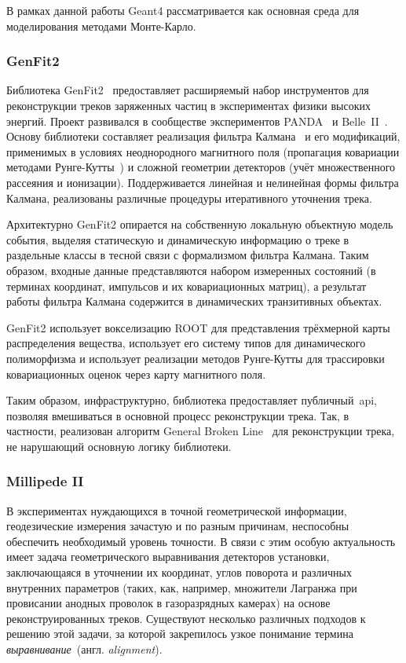 В рамках данной работы Geant4 рассматривается как основная среда для
моделирования методами Монте-Карло.

\subsubsection{GenFit2}

Библиотека GenFit2~\cite{Genfit2_Rauch_2015} предоставляет расширяемый
набор инструментов для реконструкции треков заряженных частиц
в экспериментах физики высоких энергий. Проект развивался
в сообществе экспериментов PANDA~\cite{panda-collaboration} и
Belle~II~\cite{belle-ii}. Основу библиотеки составляет реализация
фильтра Калмана~\cite{kalman-1960} и его модификаций,
применимых в условиях неоднородного
магнитного поля (пропагация ковариации методами Рунге-Кутты~\cite{StrandlieJacobians}) и
сложной геометрии детекторов (учёт множественного рассеяния и ионизации).
Поддерживается линейная и нелинейная формы фильтра
Калмана, реализованы различные процедуры итеративного уточнения
трека.

Архитектурно GenFit2 опирается на собственную локальную объектную модель
события,
выделяя статическую и динамическую информацию о треке в раздельные классы
в тесной связи с формализмом фильтра Калмана. Таким образом, входные
данные представляются набором измеренных состояний (в терминах координат,
импульсов и их ковариационных матриц), а результат работы фильтра Калмана
содержится в динамических транзитивных объектах.

GenFit2 использует вокселизацию ROOT для представления трёхмерной карты
распределения вещества,
использует его систему типов для динамического полиморфизма и использует
реализации методов Рунге-Кутты для трассировки ковариационных оценок
через карту магнитного поля.

Таким образом, инфраструктурно, библиотека предоставляет
публичный~\acrshort{api}, позволяя вмешиваться в основной процесс
реконструкции трека. Так, в частности, реализован алгоритм
General Broken Line~\cite{gbp-kleinwort} для реконструкции трека,
не нарушающий основную логику библиотеки.

\subsubsection{Millipede II}

В экспериментах нуждающихся в точной геометрической информации,
геодезические измерения зачастую и по разным причинам, неспособны обеспечить
необходимый уровень точности. В связи с этим особую актуальность имеет
задача геометрического выравнивания детекторов установки,
заключающаяся в уточнении их координат, углов поворота и различных
внутренних параметров (таких, как, например, множители Лагранжа
при провисании анодных проволок в газоразрядных камерах) на основе
реконструированных треков. Существуют несколько различных подходов
к решению этой задачи, за которой закрепилось узкое понимание
термина \emph{выравнивание}~(англ. \emph{alignment}).

